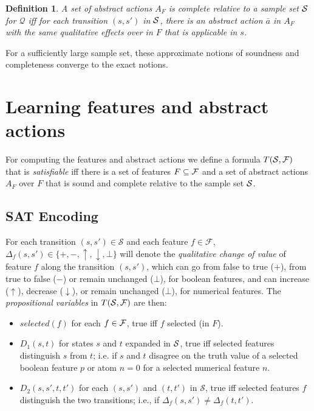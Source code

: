 \documentclass[letterpaper]{article} %
\newcommand{\Omit}[1]{}
\newtheorem{definition}{Definition}
\newcommand{\Q}{\mathcal{Q}}
\begin{document}
\begin{definition}
A set of abstract actions $A_F$ is complete   \emph{relative to a sample set} $\cal S$ for $\Q$
iff for each transition  $(s,s')$ in  $\cal S$, there is an abstract action $\bar{a}$ in $A_F$
with the same qualitative effects over in $F$ that is applicable in $s$.
\end{definition}

For a sufficiently large sample set, these approximate notions of soundness and completeness
converge to the exact notions. 

\section{Learning  features and  abstract actions}

For computing the features and abstract actions
we define  a  formula  $T({\cal S,F})$ that  is \emph{satisfiable} 
iff there is a set of features $F  \subseteq {\cal F}$ and a set of abstract actions $A_F$ over $F$
that is sound and complete relative to the sample set ${\cal S}$.

\Omit{The  sets  $F$ and $A_F$ can
     then be read off  from any  satisfying assignment. Later we will add weights
     to so
     me of the clauses to establish a preference over these assignments
     (e.g., for  minimizing $|F|$).}

\subsection{SAT Encoding}


For each transition  $(s, s') \in \mathcal{S}$ and each feature $f \in \mathcal{F}$,
$\Delta_f(s, s') \in \{+, -, \uparrow, \downarrow, \bot\}$ will denote the \emph{qualitative change of value}
of feature $f$ along the transition $(s, s')$, which can go from false to true ($+$), from true to false ($-$) or remain unchanged ($\bot$),
for boolean features, and can increase ($\uparrow$), decrease ($\downarrow$), or remain unchanged ($\bot$), for numerical features.
The \emph{propositional variables}  in $T({\cal S,F})$ are then:

  \begin{itemize}
  \item  $selected(f)$ for each $f \in {\cal F}$,  true iff  $f$  selected  (in  $F$).
  \item $D_1(s,t)$ for  states   $s$ and $t$ expanded in ${\cal S}$,  true iff selected features distinguish  $s$ from $t$;
      i.e.  if $s$ and $t$ disagree on the truth value of a selected boolean feature $p$ or atom $n=0$ for a selected numerical feature $n$.
  \item $D_2(s, s', t, t')$ for  each $(s, s')$ and $(t, t')$ in $\mathcal{S}$,
    true iff selected features $f$ distinguish the two transitions; i.e., if $\Delta_f(s, s')\not=\Delta_f(t,t')$. 
  \end{itemize}
\end{document}
